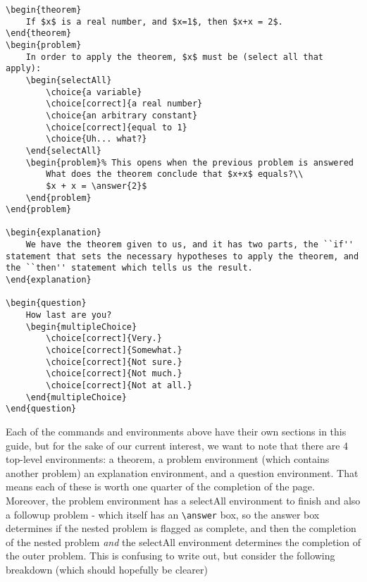 \documentclass{ximera}
\begin{document}
\begin{verbatim}
\begin{theorem}
    If $x$ is a real number, and $x=1$, then $x+x = 2$.
\end{theorem}
\begin{problem}
    In order to apply the theorem, $x$ must be (select all that apply):
    \begin{selectAll}
        \choice{a variable}
        \choice[correct]{a real number}
        \choice{an arbitrary constant}
        \choice[correct]{equal to 1}
        \choice{Uh... what?}
    \end{selectAll}
    \begin{problem}% This opens when the previous problem is answered
        What does the theorem conclude that $x+x$ equals?\\
        $x + x = \answer{2}$
    \end{problem}
\end{problem}
 
\begin{explanation}
    We have the theorem given to us, and it has two parts, the ``if'' statement that sets the necessary hypotheses to apply the theorem, and the ``then'' statement which tells us the result.
\end{explanation}
 
\begin{question}
    How last are you?
    \begin{multipleChoice}
        \choice[correct]{Very.}
        \choice[correct]{Somewhat.}
        \choice[correct]{Not sure.}
        \choice[correct]{Not much.}
        \choice[correct]{Not at all.}
    \end{multipleChoice}
\end{question}
\end{verbatim}

Each of the commands and environments above have their own sections in
this guide, but for the sake of our current interest, we want to note that
there are 4 top-level environments: a theorem, a problem environment (which
contains another problem) an explanation environment, and a question
environment. That means each of these is worth one quarter of the completion of
the page. Moreover, the problem environment has a selectAll environment to
finish and also a followup problem - which itself has an \verb|\answer| box, so
the answer box determines if the nested problem is flagged as complete, and
then the completion of the nested problem \textit{and} the selectAll
environment determines the completion of the outer problem. This is confusing
to write out, but consider the following breakdown (which should hopefully be
clearer)
\end{document}

